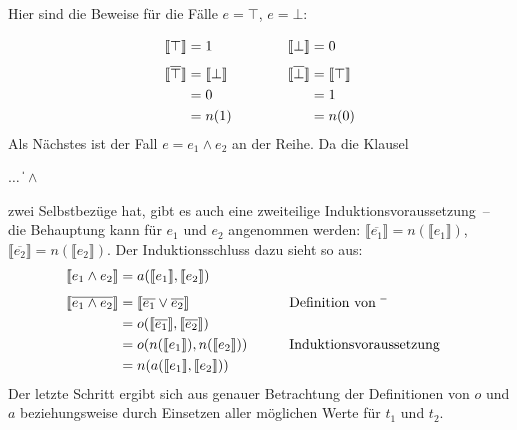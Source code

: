 Hier sind die Beweise für die Fälle $e=\top$, $e=\bot$:

\begin{displaymath}
  \begin{array}{c@{\qquad\qquad}c}
  \begin{split}
  \llbracket \top \rrbracket &= 1\\[1ex]
  \llbracket \overline{\top} \rrbracket &= \llbracket \bot \rrbracket
  \\ &= 0
  \\ &= n(1)
\end{split}
&
\begin{split}
  \llbracket \bot \rrbracket &= 0\\[1ex]
  \llbracket \overline{\bot} \rrbracket &= \llbracket \top \rrbracket
  \\ &= 1
  \\ &= n(0)
\end{split}
\end{array}
\end{displaymath}
%
Als Nächstes ist der Fall $e=e_1\wedge e_2$ an der Reihe.  Da die
Klausel 
\begin{grammar}
   \: $\ldots$ \|  $\wedge$ 
\end{grammar}
%
zwei Selbstbezüge hat, gibt es auch eine zweiteilige
Induktionsvoraussetzung~-- die Behauptung kann für $e_1$ und $e_2$
angenommen werden: $\llbracket \overline{e_1} \rrbracket =
n(\llbracket e_1\rrbracket)$, $\llbracket \overline{e_2} \rrbracket =
n(\llbracket e_2\rrbracket)$.  Der Induktionsschluss dazu sieht so aus:
%
\begin{alignat*}{3}
  \llbracket e_1 \wedge e_2 \rrbracket &= a(\llbracket
  e_1\rrbracket, \llbracket e_2\rrbracket)
  \\[1ex]
  \llbracket \overline{e_1 \wedge e_2} \rrbracket &= \llbracket
  \overline{e_1} \vee \overline{e_2} \rrbracket
  && \qquad \text{Definition von $\overline{\raisebox{1ex}{\hspace{1ex}}}$}
  \\
  &= 
  o(\llbracket \overline{e_1} \rrbracket,  \llbracket \overline{e_2}
  \rrbracket)
  \\
  &= o(n(\llbracket e_1\rrbracket), n(\llbracket e_2\rrbracket))
  && \qquad \text{Induktionsvoraussetzung}
  \\
  &= n(a(\llbracket e_1\rrbracket, \llbracket e_2\rrbracket))
\end{alignat*}
%
Der letzte Schritt ergibt sich aus genauer Betrachtung der
Definitionen von $o$ und $a$ beziehungsweise durch Einsetzen aller möglichen
Werte für $t_1$ und $t_2$.

